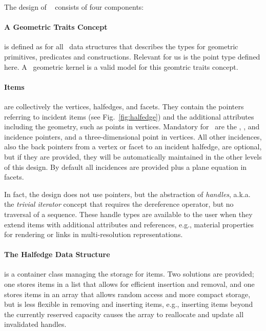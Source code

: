 
The design of \cgalpoly\ \cite{k-ugpdd-99} consists of four components:

\paragraph*{A Geometric Traits Concept} is defined as for all \cgal\
data structures that describes the types for geometric primitives,
predicates and constructions. Relevant for us is the point type
defined here. A \cgal\ geometric kernel is a valid model for this
geomtric traits concept.

\paragraph*{Items}  are collectively the  vertices, halfedges, and
facets. They contain the pointers referring to incident items (see
Fig.~\ref{fig:halfedge}) and the additional attributes including the
geometry, such as points in vertices. Mandatory for \cgalpoly\ are the
\CodeFmt{next}, \CodeFmt{opposite}, and \CodeFmt{vertex} incidence
pointers, and a three-dimensional point in vertices. All other
incidences, also the back pointers from a vertex or facet to an
incident halfedge, are optional, but if they are provided, they will
be automatically maintained in the other levels of this design. By
default all incidences are provided plus a plane equation in facets.

In fact, the design does not use pointers, but the abstraction of
\emph{handles}, a.k.a. the \emph{trivial iterator\/} concept that
requires the dereference operator, but no traversal of a sequence.
These handle types are available to the user when they extend items
with additional attributes and references, e.g., material properties
for rendering or links in multi-resolution representations.

\paragraph*{The Halfedge Data Structure} is a container class managing
the storage for items. Two solutions are provided; one stores items in
a list that allows for efficient insertion and removal, and one
stores items in an array that allows random access and more compact
storage, but is less flexible in removing and inserting items, e.g.,
inserting items beyond the currently reserved capacity causes the
array to reallocate and update all invalidated handles.

